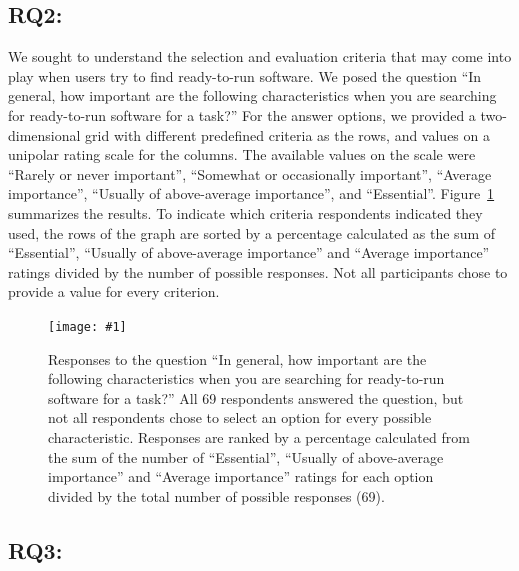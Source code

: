 \documentclass[review]{elsarticle}
\newcommand{\totalRespondents}{69\xspace}
\newcommand{\includefile}[1]{\texttt{[image: \#1]}}
\begin{document}
\subsection{RQ2: \rqtwotext}
\label{results-rqtwo}

We sought to understand the selection and evaluation criteria that may come into play when users try to find ready-to-run software.  We posed the question ``In general, how important are the following characteristics when you are searching for ready-to-run software for a task?''  For the answer options, we provided a two-dimensional grid with different predefined criteria as the rows, and values on a unipolar rating scale for the columns.  The available values on the scale were ``Rarely or never important'', ``Somewhat or occasionally important'', ``Average importance'', ``Usually of above-average importance'', and ``Essential''. Figure~\ref{criteria-ready-to-run} summarizes the results.  To indicate which criteria respondents indicated they used, the rows of the graph are sorted by a percentage calculated as the sum of ``Essential'', ``Usually of above-average importance'' and ``Average importance'' ratings divided by the number of possible responses.  Not all participants chose to provide a value for every criterion.


\begin{figure}[t]
  \centering
  \includefile{files/plots/bar-graph-criteria-ready-to-run-reranked-v2.pdf}
  \caption{Responses to the question ``In general, how important are the following characteristics when you are searching for ready-to-run software for a task?'' All \totalRespondents respondents answered the question, but not all respondents chose to select an option for every possible characteristic.  Responses are ranked by a percentage calculated from the sum of the number of ``Essential'', ``Usually of above-average importance'' and ``Average importance'' ratings for each option divided by the total number of possible responses (\totalRespondents).}
  \label{criteria-ready-to-run}
\end{figure}

\clearpage

\subsection{RQ3: \rqthreetext}
\label{results-rqthree}
\end{document}
